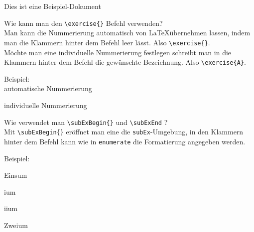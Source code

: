 \documentclass{uni_tue_template}
\begin{document}
Dies ist eine Beispiel-Dokument

Wie kann man den \verb+\exercise{}+ Befehl verwenden?\\
Man kann die Nummerierung automatisch von \LaTeX\hspace{1.5mm}übernehmen lassen, indem man die Klammern hinter dem Befehl leer lässt. Also \verb+\exercise{}+.\\
Möchte man eine individuelle Nummerierung festlegen schreibt man in die Klammern hinter dem Befehl die gewünschte Bezeichnung. Also \verb+\exercise{A}+.

Beispiel:\\
\exercise{}
\exercise{}
automatische Nummerierung

individuelle Nummerierung

\vspace{10mm}
Wie verwendet man \verb+\subExBegin{}+ und \verb+\subExEnd+ ?\\
Mit \verb+\subExBegin{}+ eröffnet man eine die \verb+subEx+-Umgebung, in den Klammern hinter dem Befehl kann wie in \verb+enumerate+ die Formatierung angegeben werden.

Beispiel:
\subExBegin{}
	\item Einsum
	\subExBegin{}
		\item ium
		\item iium
	\subExEnd
	\item Zweium
\subExEnd
\end{document}
